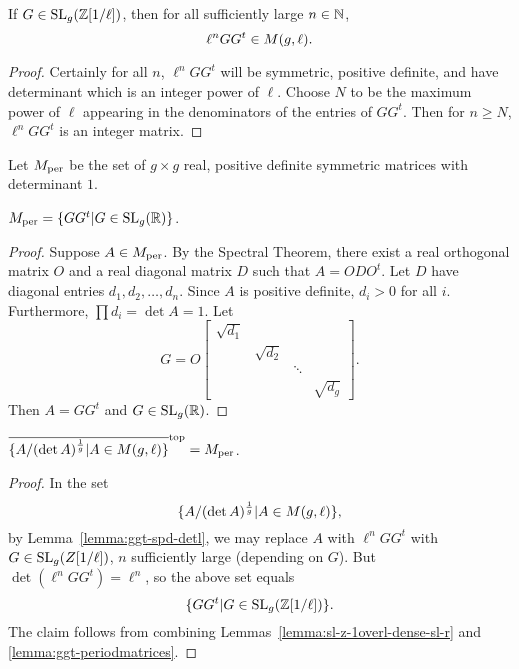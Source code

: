 \documentclass{amsart}
\begin{document}
\begin{lemma}\label{lemma:ggt-spd-detl}
  If $G \in \operatorname{SL}_g(\mathbb{Z}[1/\ell])$, then for all sufficiently large $n \in \mathbb{N}$,
  \[
    \ell^n GG^t \in M(g,\ell).
  \]
\end{lemma}

\begin{proof}
  Certainly for all $n$, $\ell^n GG^t$ will be symmetric, positive definite, and have determinant which is an integer power of $\ell$. Choose $N$ to be the maximum power of $\ell$ appearing in the denominators of the entries of $GG^t$. Then for $n \geq N$, $\ell^n GG^t$ is an integer matrix.
\end{proof}


\begin{definition}
  Let $M_{\textrm{per}}$ be the set of $g \times g$ real, positive definite symmetric matrices  with determinant $1$.
\end{definition}

\begin{lemma}\label{lemma:ggt-periodmatrices}
  $M_{\textrm{per}} = \{GG^t | G \in \operatorname{SL}_g(\mathbb{R})\}$.
\end{lemma}

\begin{proof}
  Suppose $A \in M_{\textrm{per}}$. By the Spectral Theorem, there exist a real orthogonal matrix $O$ and a real diagonal matrix $D$ such that $A = ODO^t$. Let $D$ have diagonal entries $d_1, d_2, \dots, d_n$. Since $A$ is positive definite, $d_i > 0$ for all $i$. Furthermore, $\prod d_i = \det A = 1$. Let
  \[
    G = O
    \begin{bmatrix}
      \sqrt{d_1} & & & \\
      & \sqrt{d_2} & & \\
      & & \ddots & \\
      & & & \sqrt{d_{g}}
    \end{bmatrix}.
\]
Then $A = GG^t$ and $G \in \operatorname{SL}_g(\mathbb{R})$.
\end{proof}

\begin{proposition}\label{prop:A-over-detA}
  $\overline{\{A/(\det A)^{\frac{1}{g}} | A \in M(g,\ell)\}}^\mathrm{top} = M_{\textrm{per}}$.
\end{proposition}

\begin{proof}
  In the set
  \[
    \{A/(\det A)^{\frac{1}{g}} | A \in M(g,\ell)\},
  \]
  by Lemma~\ref{lemma:ggt-spd-detl}, we may replace $A$ with $\ell^n GG^t$ with $G \in \operatorname{SL}_g(Z[1/\ell])$, $n$ sufficiently large (depending on $G$). But $\det (\ell^n GG^t) = \ell^n$, so the above set equals
  \[
    \{GG^t | G \in \operatorname{SL}_g(\mathbb{Z}[1/\ell])\}.
  \]
  The claim follows from combining Lemmas~\ref{lemma:sl-z-1overl-dense-sl-r} and \ref{lemma:ggt-periodmatrices}.
\end{proof}
\end{document}
